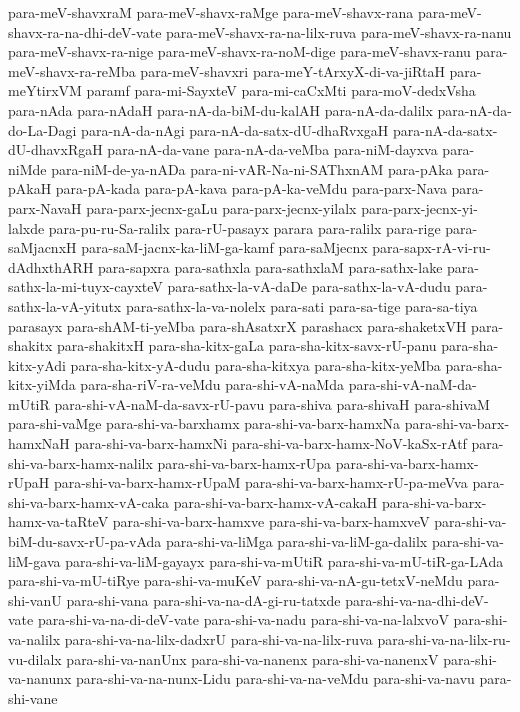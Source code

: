 {para-meV-shavxraM
para-meV-shavx-raMge
para-meV-shavx-rana
para-meV-shavx-ra-na-dhi-deV-vate
para-meV-shavx-ra-na-lilx-ruva
para-meV-shavx-ra-nanu
para-meV-shavx-ra-nige
para-meV-shavx-ra-noM-dige
para-meV-shavx-ranu
para-meV-shavx-ra-reMba
para-meV-shavxri
para-meY-tArxyX-di-va-jiRtaH
para-meYtirxVM
paramf
para-mi-SayxteV
para-mi-caCxMti
para-moV-dedxVsha
para-nAda
para-nAdaH
para-nA-da-biM-du-kalAH
para-nA-da-dalilx
para-nA-da-do-La-Dagi
para-nA-da-nAgi
para-nA-da-satx-dU-dhaRvxgaH
para-nA-da-satx-dU-dhavxRgaH
para-nA-da-vane
para-nA-da-veMba
para-niM-dayxva
para-niMde
para-niM-de-ya-nADa
para-ni-vAR-Na-ni-SAThxnAM
para-pAka
para-pAkaH
para-pA-kada
para-pA-kava
para-pA-ka-veMdu
para-parx-Nava
para-parx-NavaH
para-parx-jecnx-gaLu
para-parx-jecnx-yilalx
para-parx-jecnx-yi-lalxde
para-pu-ru-Sa-ralilx
para-rU-pasayx
parara
para-ralilx
para-rige
para-saMjacnxH
para-saM-jacnx-ka-liM-ga-kamf
para-saMjecnx
para-sapx-rA-vi-ru-dAdhxthARH
para-sapxra
para-sathxla
para-sathxlaM
para-sathx-lake
para-sathx-la-mi-tuyx-cayxteV
para-sathx-la-vA-daDe
para-sathx-la-vA-dudu
para-sathx-la-vA-yitutx
para-sathx-la-va-nolelx
para-sati
para-sa-tige
para-sa-tiya
parasayx
para-shAM-ti-yeMba
para-shAsatxrX
parashacx
para-shaketxVH
para-shakitx
para-shakitxH
para-sha-kitx-gaLa
para-sha-kitx-savx-rU-panu
para-sha-kitx-yAdi
para-sha-kitx-yA-dudu
para-sha-kitxya
para-sha-kitx-yeMba
para-sha-kitx-yiMda
para-sha-riV-ra-veMdu
para-shi-vA-naMda
para-shi-vA-naM-da-mUtiR
para-shi-vA-naM-da-savx-rU-pavu
para-shiva
para-shivaH
para-shivaM
para-shi-vaMge
para-shi-va-barxhamx
para-shi-va-barx-hamxNa
para-shi-va-barx-hamxNaH
para-shi-va-barx-hamxNi
para-shi-va-barx-hamx-NoV-kaSx-rAtf
para-shi-va-barx-hamx-nalilx
para-shi-va-barx-hamx-rUpa
para-shi-va-barx-hamx-rUpaH
para-shi-va-barx-hamx-rUpaM
para-shi-va-barx-hamx-rU-pa-meVva
para-shi-va-barx-hamx-vA-caka
para-shi-va-barx-hamx-vA-cakaH
para-shi-va-barx-hamx-va-taRteV
para-shi-va-barx-hamxve
para-shi-va-barx-hamxveV
para-shi-va-biM-du-savx-rU-pa-vAda
para-shi-va-liMga
para-shi-va-liM-ga-dalilx
para-shi-va-liM-gava
para-shi-va-liM-gayayx
para-shi-va-mUtiR
para-shi-va-mU-tiR-ga-LAda
para-shi-va-mU-tiRye
para-shi-va-muKeV
para-shi-va-nA-gu-tetxV-neMdu
para-shi-vanU
para-shi-vana
para-shi-va-na-dA-gi-ru-tatxde
para-shi-va-na-dhi-deV-vate
para-shi-va-na-di-deV-vate
para-shi-va-nadu
para-shi-va-na-lalxvoV
para-shi-va-nalilx
para-shi-va-na-lilx-dadxrU
para-shi-va-na-lilx-ruva
para-shi-va-na-lilx-ru-vu-dilalx
para-shi-va-nanUnx
para-shi-va-nanenx
para-shi-va-nanenxV
para-shi-va-nanunx
para-shi-va-na-nunx-Lidu
para-shi-va-na-veMdu
para-shi-va-navu
para-shi-vane
}
